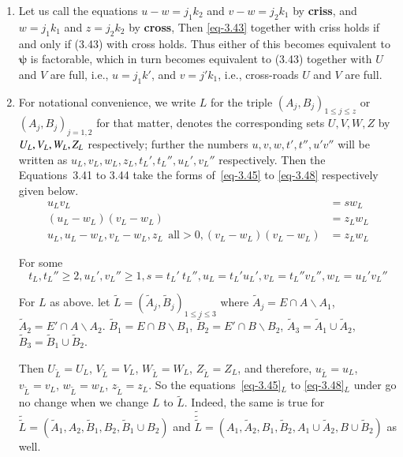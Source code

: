 \documentclass[a4paper,12pt]{article}
\theoremstyle{definition}
\theoremstyle{underlinethm}
\theoremstyle{definition}
\begin{document}
\begin{enumerate}[label=(\alph*)]
\item Let us call the equations $u-w = j_{1}k_{2}$ and $v-w = j_{2} k_{1}$ by \textbf{criss}, and $w =j_{1}k_{1}$ and $z=j_{2} k_{2}$ by \textbf{cross}, Then \eqref{eq-3.43} together with criss holds if and only if (3.43) with cross holds. Thus either of this  becomes equivalent to $\boldsymbol{\psi}$ is factorable, which in turn becomes equivalent to (3.43) together with $U$ and $V$ are full, i.e., $u=j_{1} k'$, and $v=j'k_{1}$, i.e., cross-roads $U$ and $V$ are full.

\item For notational convenience, we write $L$ for the triple $(A_{j}, B_{j})_{1 \leq j \leq z}$ or\break $(A_{j}, B_{j})_{j=1,2}$ for that matter, denotes the corresponding sets $U, V, W, Z$ by $U_{L}, V_{L},\break W_{L}, Z_{L}$ respectively; further the numbers $u,v,w, t', t'', u' v''$ will be written as $u_{L}, v_{L}, w_{L}, z_{L}, t_{L}', t_{L}'', u_{L}', v_{L}''$ respectively. Then the Equations~{3.41} to {3.44} take the forms of~\eqref{eq-3.45} to \eqref{eq-3.48} respectively given below.
\begin{align*}
u_{L} v_{L} &= sw_{L}\tag{3.45}\label{eq-3.45}\\
(u_{L}- w_{L}) (v_{L} - w_{L}) &= z_{L} w_{L}\tag{3.46}\label{eq-3.46}\\
u_{L}, u_{L}-w_{L}, v_{L}-w_{L}, z_{L}~~\text{all} > 0, (v_{L}- w_{L})(v_{L}-w_{L}) &= z_{L}w_{L}\tag{3.47}\label{eq-3.47}
\end{align*}

For some 
\begin{equation}
t_{L}, t_{L}'' \geq 2, u_{L}', v_{L}'' \geq 1, s=t_{L}'~t_{L}'', u_{L}= t_{L}' u_{L}', v_{L} = t_{L}'' v_{L}'', w_{L} = u_{L}' v_{L}'' \tag{3.48}\label{eq-3.48}
\end{equation}

For $L$ as above. let $\widetilde{L} = (\widetilde{A}_{j}, \widetilde{B}_{j})_{1 \leq j \leq 3}$ where $\widetilde{A}_{j} = E \cap A \smallsetminus A_{1}$, $\widetilde{A}_{2} = E' \cap A \smallsetminus A_{2}$. $\widetilde{B}_{1} = E \cap B \smallsetminus B_{1}$, $\widetilde{B}_{2} = E' \cap B \smallsetminus B_{2}$, $\widetilde{A}_{3} = \widetilde{A}_{1} \cup \widetilde{A}_{2}$, $\widetilde{B}_{3} = \widetilde{B}_{1} \cup \widetilde{B}_{2}$.

Then $U_{\widetilde{L}} = U_{L}$, $V_{\widetilde{L}} = V_{L}$, $W_{\widetilde{L}} =W_{L}$, $Z_{\widetilde{L}} =Z_{L}$, and therefore, $u_{\widetilde{L}} = u_{L}$, $v_{\widetilde{L}} = v_{L}$, $w_{\widetilde{L}} = w_{L}$, $z_{\widetilde{L}} =z_{L}$. So the equations~\eqref{eq-3.45}$_{L}$ to \eqref{eq-3.48}$_{L}$
under go no change when we change $L$ to $\widetilde{L}$. Indeed, the same is true for $\widetilde{\widetilde{L}} = (\widetilde{A}_{1}, A_{2}, \widetilde{B}_{1}, B_{2}, \widetilde{B}_{1} \cup B_{2})$ and $\widetilde{\widetilde{\widetilde{L}}} = (A_{1}, \widetilde{A}_{2}, B_{1}, \widetilde{B}_{2}, A_{1} \cup \widetilde{A}_{2}, B \cup \widetilde{B}_{2})$ as well.


\end{enumerate}
\end{document}

